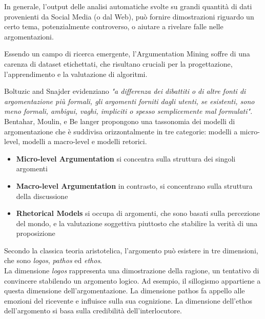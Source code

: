 In generale, l'output delle analisi automatiche svolte su grandi quantità di dati provenienti da Social Media (o dal Web), può fornire dimostrazioni riguardo un certo tema, potenzialmente controverso, o aiutare a rivelare falle nelle argomentazioni.

Essendo un campo di ricerca emergente, l'Argumentation Mining soffre di una carenza di dataset etichettati, che risultano cruciali per la progettazione, l'apprendimento e la valutazione di algoritmi. 

Boltuzic  and Snajder \cite{boltuvzic2014} evidenziano \textit{"a differenza dei dibattiti o di altre fonti di argomentazione più formali, gli argomenti forniti dagli utenti, se esistenti, sono meno formali, ambigui, vaghi, impliciti o spesso semplicemente mal formulati"}. Bentahar, Moulin, e Be langer \cite{bentahar2010} propongono una tassonomia dei modelli di argomentazione che è suddivisa orizzontalmente in tre categorie: modelli a micro-level, modelli a macro-level e modelli retorici.

\begin{itemize}
    \item \textbf{Micro-level Argumentation} si concentra sulla struttura dei singoli argomenti
    \item \textbf{Macro-level Argumentation} in contrasto, si concentrano sulla struttura della discussione
    \item \textbf{Rhetorical Models} si occupa di argomenti, che sono basati sulla percezione del mondo, e la valutazione soggettiva piuttosto che stabilire la verità di una proposizione
\end{itemize}

Secondo la classica teoria aristotelica, l'argomento può esistere in tre dimensioni, che sono \textit{logos}, \textit{pathos} ed \textit{ethos}. \\
La dimensione \textit{logos} rappresenta una dimostrazione della ragione, un tentativo di convincere stabilendo un argomento logico. Ad esempio, il sillogismo appartiene a questa dimensione dell'argomentazione. La dimensione pathos fa appello alle emozioni del ricevente e influisce sulla sua cognizione. La dimensione dell'ethos dell'argomento si basa sulla credibilità dell'interlocutore.


